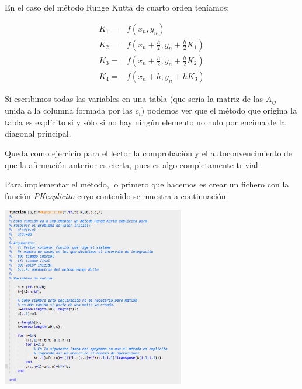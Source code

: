 En el caso del método Runge Kutta de cuarto orden teníamos:

\[
\begin{array}{ll}
K_1 = & f(x_n,y_n)\\
K_2 = & f(x_n+\frac{h}{2}, y_n+\frac{h}{2}K_1)\\
K_3 = & f(x_n+\frac{h}{2}, y_n + \frac{h}{2}K_2)\\
K_4 = & f(x_n+h, y_n + h K_3)
\end{array}
\]

Si escribimos todas las variables en una tabla (que sería la matriz de las $A_{ij}$ unida a la columna formada por las $c_i$) podemos ver que el método que origina la tabla es explícito si y sólo si no hay ningún elemento no nulo por encima de la diagonal principal.

\obs Queda como ejercicio para el lector la comprobación y el autoconvencimiento de que la afirmación anterior es cierta, pues es algo completamente trivial.

Para implementar el método, lo primero que hacemos es crear un fichero con la función \textit{PKexplicito} cuyo contenido se muestra a continuación
\begin{center}
\includegraphics[width=0.6\textwidth]{img/RK4_explicito.png}
\end{center}

